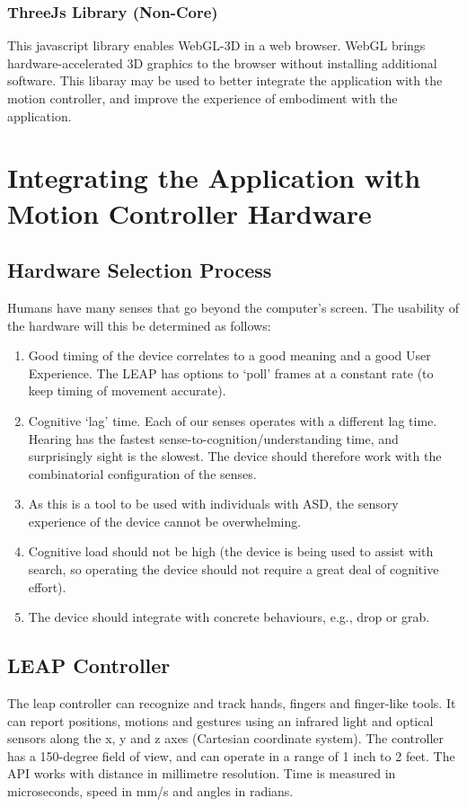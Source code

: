 \documentclass[10pt]{article}
\begin{document}
\subsubsection{ThreeJs Library (Non-Core)}
This javascript library enables WebGL-3D in a web browser. WebGL brings hardware-accelerated 3D graphics to the browser without installing additional software. This libaray may be used to better integrate the application with the motion controller, and improve the experience of embodiment with the application.


\section{Integrating the Application with Motion Controller Hardware }\label{hardware}
\subsection{Hardware Selection Process}
Humans have many senses that go beyond the computer's screen. The usability of the hardware will this be determined as follows: 
\begin{enumerate}
\item Good timing of the device correlates to a good meaning and a good User Experience. The LEAP has options to ‘poll’ frames at a constant rate (to keep timing of movement accurate).
\item Cognitive ‘lag’ time. Each of our senses operates with a different lag time. Hearing has the fastest sense-to-cognition/understanding time, and surprisingly sight is the slowest. The device should therefore work with the combinatorial configuration of the senses.
\item As this is a tool to be used with individuals with ASD, the sensory experience of the device cannot be overwhelming.
\item Cognitive load should not be high (the device is being used to assist with search, so operating the device should not require a great deal of cognitive effort).
\item The device should integrate with concrete behaviours, e.g., drop or grab. 

\end{enumerate}

\subsection{LEAP Controller}
The leap controller can recognize and track hands, fingers and finger-like tools. It can report positions, motions and gestures using an infrared light and optical sensors along the x, y and z axes (Cartesian coordinate system). The controller has a 150-degree field of view, and can operate in a range of 1 inch to 2 feet. The API works with distance in millimetre resolution. Time is measured in microseconds, speed in mm/s and angles in radians.
\end{document}

